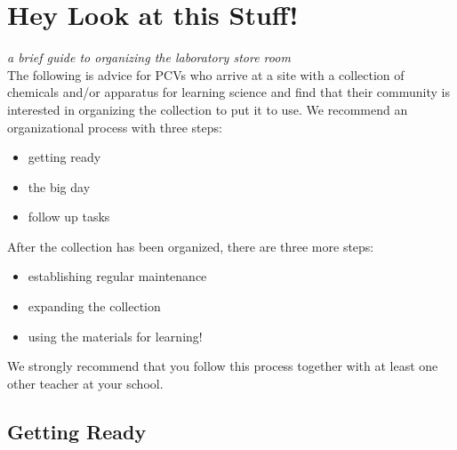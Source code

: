 \documentclass{report}
\begin{document}
\section{Hey Look at this Stuff!}
\textit{a brief guide to organizing the laboratory store room}\\

The following is advice for PCVs who arrive at a site with a collection of chemicals and/or apparatus for learning science and find that their community is interested in organizing the collection to put it to use. We recommend an organizational process with three steps:
\begin{itemize}
\item{getting ready}
\item{the big day}
\item{follow up tasks}
\end{itemize}

After the collection has been organized, there are three more steps:
\begin{itemize}
\item{establishing regular maintenance}
\item{expanding the collection}
\item{using the materials for learning!}
\end{itemize}

We strongly recommend that you follow this process together with at least one other teacher at your school.

\subsection{Getting Ready}
\end{document}
